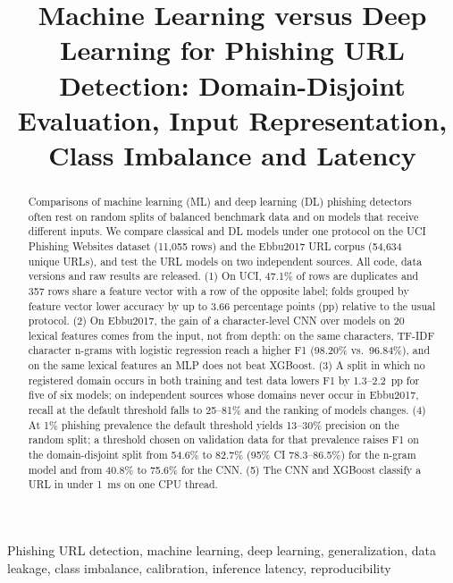 \documentclass[conference]{IEEEtran}
\begin{document}
\title{Machine Learning versus Deep Learning for Phishing URL Detection: Domain-Disjoint Evaluation, Input Representation, Class Imbalance and Latency}

\author{
}

\maketitle

\begin{abstract}
Comparisons of machine learning (ML) and deep learning (DL) phishing detectors often rest on random splits of balanced benchmark data and on models that receive different inputs. We compare classical and DL models under one protocol on the UCI Phishing Websites dataset (11,055 rows) and the Ebbu2017 URL corpus (54,634 unique URLs), and test the URL models on two independent sources. All code, data versions and raw results are released. (1) On UCI, 47.1\% of rows are duplicates and 357 rows share a feature vector with a row of the opposite label; folds grouped by feature vector lower accuracy by up to 3.66 percentage points (pp) relative to the usual protocol. (2) On Ebbu2017, the gain of a character-level CNN over models on 20 lexical features comes from the input, not from depth: on the same characters, TF-IDF character n-grams with logistic regression reach a higher F1 (98.20\% vs.\ 96.84\%), and on the same lexical features an MLP does not beat XGBoost. (3) A split in which no registered domain occurs in both training and test data lowers F1 by 1.3--2.2~pp for five of six models; on independent sources whose domains never occur in Ebbu2017, recall at the default threshold falls to 25--81\% and the ranking of models changes. (4) At 1\% phishing prevalence the default threshold yields 13--30\% precision on the random split; a threshold chosen on validation data for that prevalence raises F1 on the domain-disjoint split from 54.6\% to 82.7\% (95\% CI 78.3--86.5\%) for the n-gram model and from 40.8\% to 75.6\% for the CNN. (5) The CNN and XGBoost classify a URL in under 1~ms on one CPU thread.
\end{abstract}

\begin{IEEEkeywords}
Phishing URL detection, machine learning, deep learning, generalization, data leakage, class imbalance, calibration, inference latency, reproducibility
\end{IEEEkeywords}
\end{document}
